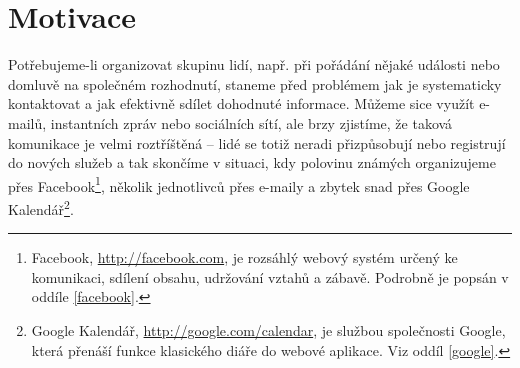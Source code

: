 \documentclass[12pt,oneside,final]{fithesis2}
\begin{document}







\chapter{Motivace}\label{motivation}
Potřebujeme-li organizovat skupinu lidí, např. při pořádání nějaké události nebo domluvě na společném rozhodnutí, staneme před problémem jak je systematicky kontaktovat a jak efektivně sdílet dohodnuté informace. Můžeme sice využít e-mailů, instantních zpráv nebo sociálních sítí, ale brzy zjistíme, že taková komunikace je velmi roztříštěná -- lidé se totiž neradi přizpůsobují nebo registrují do nových služeb a tak skončíme v situaci, kdy polovinu známých organizujeme přes Facebook\footnote{Facebook, \url{http://facebook.com}, je rozsáhlý webový systém určený ke komunikaci, sdílení obsahu, udržování vztahů a zábavě. Podrobně je popsán v oddíle \ref{facebook}.}, několik jednotlivců přes e-maily a zbytek snad přes Google Kalendář\footnote{Google Kalendář, \url{http://google.com/calendar}, je službou společnosti Google, která přenáší funkce klasického diáře do webové aplikace. Viz oddíl \ref{google}.}.
\end{document}
